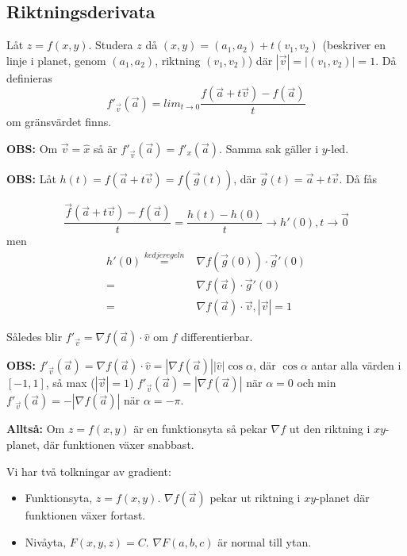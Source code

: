 \documentclass[a4paper,12pt]{article}
\begin{document}
\subsection{Riktningsderivata}
Låt $z = f(x,y)$. Studera $z$ då $(x,y) = (a_1,a_2)+t(v_1,v_2)$ (beskriver en
linje i planet, genom $(a_1,a_2)$, riktning $(v_1, v_2)$) där
$|\vec{v}| = |(v_1, v_2)| = 1$. Då definieras
\begin{equation*}
  f'_{\vec{v}}(\vec{a}) =
  lim_{t \to 0}\frac{f(\vec{a}+t\vec{v})-f(\vec{a})}{t}
\end{equation*} om gränsvärdet finns.

\textbf{OBS:}
  Om $\vec{v} = \hat{x}$ så är $f'_{\vec{v}}(\vec{a}) = f'_x(\vec{a})$. Samma
  sak gäller i $y$-led.

\textbf{OBS:}
  Låt $h(t) = f(\vec{a}+t\vec{v}) = f(\vec{g}(t))$, där
  $\vec{g}(t)=\vec{a}+t\vec{v}$. Då fås

  \begin{equation*}
    \frac{\vec{f}(\vec{a}+t\vec{v})-f(\vec{a})}{t} = \frac{h(t)-h(0)}{t}
    \to h'(0), t \to \vec{0}
  \end{equation*}
  men
  \begin{align*}
    h'(0) \stackrel{kedjeregeln}{= } & \nabla f(\vec{g}(0)) \cdot \vec{g}'(0) \\
    = & \nabla f(\vec{a}) \cdot \vec{g}'(0) \\
    = & \nabla f(\vec{a}) \cdot \vec{v}, |\vec{v}|=1
  \end{align*}

  Således blir $f'_{\vec{v}} = \nabla f(\vec{a})\cdot \hat{v}$ om $f$
  differentierbar.

\textbf{OBS:}
  $f'_{\vec{v}}(\vec{a})=\nabla f(\vec{a}) \cdot \hat{v} =
  |\nabla f(\vec{a})||\hat{v}|\cos\alpha$, där $\cos\alpha$ antar alla värden i
  $[-1,1]$, så max ($|\vec{v}|=1$) $f'_{\vec{v}}(\vec{a})=|\nabla f(\vec{a})|$
  när $\alpha = 0$ och min $f'_{\vec{v}}(\vec{a})=-|\nabla f(\vec{a})|$ när
  $\alpha = -\pi$.

\textbf{Alltså:}
  Om $z=f(x,y)$ är en funktionsyta så pekar $\nabla f$ ut den riktning i
  $xy$-planet, där funktionen växer snabbast.

Vi har två tolkningar av gradient:
\begin{itemize}
\item Funktionsyta, $z = f(x,y)$. $\nabla f(\vec{a})$ pekar ut riktning i
  $xy$-planet där funktionen växer fortast.
\item Nivåyta, $F(x,y,z)=C$. $\nabla F(a,b,c)$ är normal till ytan.
\end{itemize}
\end{document}
